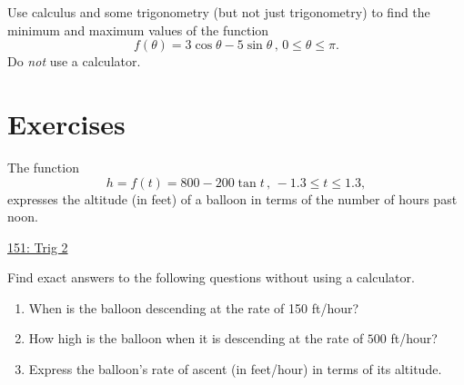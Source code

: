 \documentclass{ximera}
\begin{document}
\begin{question}  \label{QOIERlfsdreER}
Use calculus and some trigonometry (but not just trigonometry) to find the minimum and maximum values of the function
\[
   f(\theta) = 3 \cos \theta - 5\sin\theta \, , \, 0\leq \theta \leq \pi.
\]
Do \emph{not} use a calculator.
\end{question}





\section{Exercises}



\begin{question}  \label{Q:LKJMFJUFegvt4}
The function
\[
       h = f(t) = 800 - 200 \tan t \, , \, -1.3\leq t\leq 1.3,
\]
expresses the altitude (in feet) of a balloon in terms of the number of hours past noon.

\begin{onlineOnly}
    \begin{center}
\end{center}
\end{onlineOnly}

\href{https://www.desmos.com/calculator/re6nqofgs0}{151: Trig 2}

Find exact answers to the following questions without using a calculator.


\begin{enumerate}
\item When is the balloon descending at the rate of 150 ft/hour?

\item How high is the balloon when it is descending at the rate of $500$ ft/hour?

\item Express the balloon's rate of ascent (in feet/hour) in terms of its altitude.

\end{enumerate}

\end{question}
\end{document}
